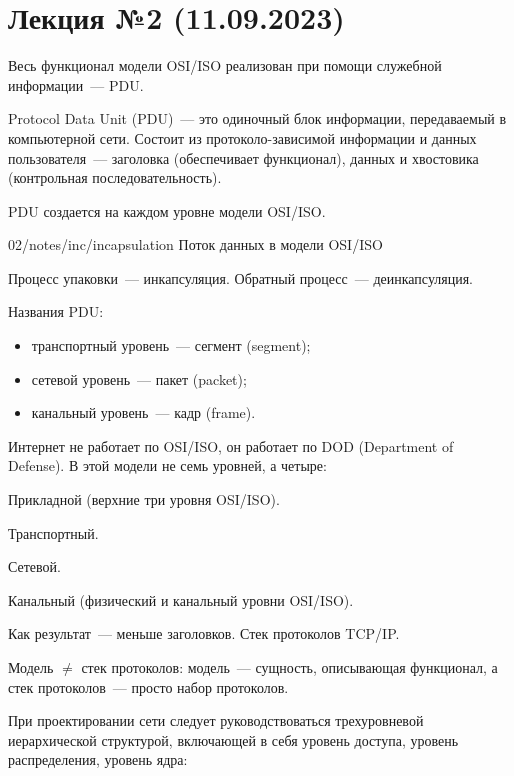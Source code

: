 \section{Лекция №2 (11.09.2023)}

Весь функционал модели OSI/ISO реализован при помощи служебной информации~--- PDU.

\begin{dd}
    Protocol Data Unit (PDU)~--- это одиночный блок информации, передаваемый в компьютерной сети. Состоит из протоколо-зависимой информации и данных пользователя~--- заголовка (обеспечивает функционал), данных и хвостовика (контрольная последовательность).
\end{dd}

PDU создается на каждом уровне модели OSI/ISO.

\image
{\textwidth}
{02/notes/inc/incapsulation}
{Поток данных в модели OSI/ISO}

Процесс упаковки~--- инкапсуляция. Обратный процесс~--- деинкапсуляция.

Названия PDU:

\begin{itemize}
    \item транспортный уровень~--- сегмент (segment);
    \item сетевой уровень~--- пакет (packet);
    \item канальный уровень~--- кадр (frame).
\end{itemize}

Интернет не работает по OSI/ISO, он работает по DOD (Department of Defense). В этой модели не семь уровней, а четыре:

\begin{etaremune}
    \item Прикладной (верхние три уровня OSI/ISO).
    \item Транспортный.
    \item Сетевой.
    \item Канальный (физический и канальный уровни OSI/ISO).
\end{etaremune}

Как результат~--- меньше заголовков. Стек протоколов TCP/IP.

Модель $\neq$ стек протоколов: модель~--- сущность, описывающая функционал, а стек протоколов~--- просто набор протоколов.

При проектировании сети следует руководствоваться трехуровневой иерархической структурой, включающей в себя уровень доступа, уровень распределения, уровень ядра:

